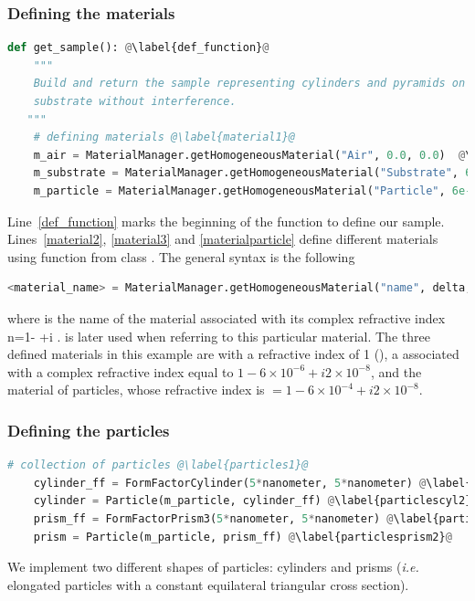 \subsubsection{Defining the materials} 
\begin{lstlisting}[language=python, style=eclipseboxed,name=ex1,nolol]
def get_sample(): @\label{def_function}@
    """
    Build and return the sample representing cylinders and pyramids on top of
    substrate without interference.
   """
    # defining materials @\label{material1}@
    m_air = MaterialManager.getHomogeneousMaterial("Air", 0.0, 0.0)  @\label{material2}@
    m_substrate = MaterialManager.getHomogeneousMaterial("Substrate", 6e-6, 2e-8) @\label{material3}@
    m_particle = MaterialManager.getHomogeneousMaterial("Particle", 6e-4, 2e-8) @\label{materialparticle}@

\end{lstlisting}
Line~\ref{def_function} marks the beginning of the
function to define our sample. Lines~\ref{material2}, \ref{material3} and \ref{materialparticle} define different
materials using function  from class
. The general syntax is the following 
\begin{lstlisting}[language=python, style=eclipse,numbers=none]
<material_name> = MaterialManager.getHomogeneousMaterial("name", delta, beta)
\end{lstlisting}
where  is the name of the
material associated with its complex refractive index
n=1- +i .  is later used when
referring to this particular material. The three defined materials in this example are  with a refractive
index of 1 (), a  associated with a complex refractive index
equal to $1-6\times 10^{-6} +i2\times 10^{-8} $, and the material of particles, whose refractive index is $=1-6\times 10^{-4}+i2\times 10^{-8}$.


%
\subsubsection{Defining the particles}
\begin{lstlisting}[language=python,style=eclipseboxed,name=ex1,nolol]
    # collection of particles @\label{particles1}@
    cylinder_ff = FormFactorCylinder(5*nanometer, 5*nanometer) @\label{particlescyl1}@
    cylinder = Particle(m_particle, cylinder_ff) @\label{particlescyl2}@
    prism_ff = FormFactorPrism3(5*nanometer, 5*nanometer) @\label{particlesprism1}@
    prism = Particle(m_particle, prism_ff) @\label{particlesprism2}@
\end{lstlisting}
We implement two different shapes of particles: cylinders and
prisms (\textit{i.e.} elongated particles with a constant equilateral triangular cross section).
 

